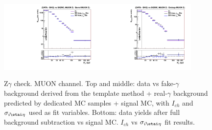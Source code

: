 \begin{figure}[htb]
\begin{center}
\includegraphics[width=0.45\textwidth]{../figs/figs_v11/MUON_ZGamma/PrepareYields/c_BkgSubtrDATAvsSIGMC_c_MUON_ZGamma__UNblind__Barrel__phoEt.pdf}\includegraphics[width=0.45\textwidth]{../figs/figs_v11/MUON_ZGamma/PrepareYields/c_BkgSubtrDATAvsSIGMC_c_MUON_ZGamma__UNblind__Endcap__phoEt.pdf}\\
  \caption{Z$\gamma$ check. MUON channel. Top and middle: data vs fake-$\gamma$ background derived from the template method + real-$\gamma$ background predicted by dedicated MC samples + signal MC, with $I_{ch}$ and $\sigma_{i\etai\eta}$ used as fit variables. Bottom: data yields after full background subtraction vs signal MC. $I_{ch}$ vs $\sigma_{i\etai\eta}$ fit results. }
  \label{fig:DDvsMC_Zg_Data_MUON}
  \end{center}
\end{figure}


